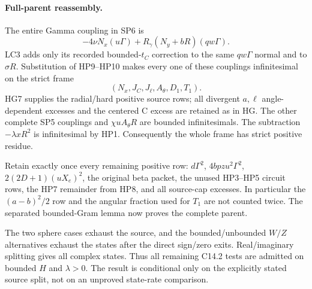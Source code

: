 \paragraph{Full-parent reassembly.}
The entire Gamma coupling in SP6 is
\[
 -4\nu N_x(u\Gamma)+R_\gamma(N_y+bR)(qw\Gamma).
\]
LC3 adds only its recorded bounded-$t_C$ correction to the same
$qw\Gamma$ normal and to $\sigma R$.  Substitution of HP9--HP10
makes every one of these couplings infinitesimal on the strict frame
\[
 (N_x,J_C,J_\ell,A_\theta,D_1,T_1).
\]
HG7 supplies the radial/hard positive source rows; all divergent
$a,\ell$ angle-dependent excesses and the centered C excess are
retained as in HG.  The other complete SP5 couplings and
$\chi uA_\theta R$ are bounded infinitesimals.  The subtraction
$-\lambda xR^2$ is infinitesimal by HP1.  Consequently the whole
frame has strict positive residue.

Retain exactly once every remaining positive row: $d\Gamma^2$,
$4bpzu^2\Gamma^2$, $2(2D+1)(uX_e)^2$, the original beta packet,
the unused HP3--HP5 circuit rows, the HP7 remainder from HP8, and
all source-cap excesses.  In particular the $(a-b)^2/2$ row and
the angular fraction used for $T_1$ are not counted twice.
The separated bounded-Gram lemma now proves the complete parent.

The two sphere cases exhaust the source, and the bounded/unbounded
$W/Z$ alternatives exhaust the states after the direct sign/zero
exits.  Real/imaginary splitting gives all complex states.  Thus all
remaining C14.2 tests are admitted on bounded $H$ and $\lambda>0$.
The result is conditional only on the explicitly stated source split,
not on an unproved state-rate comparison.
